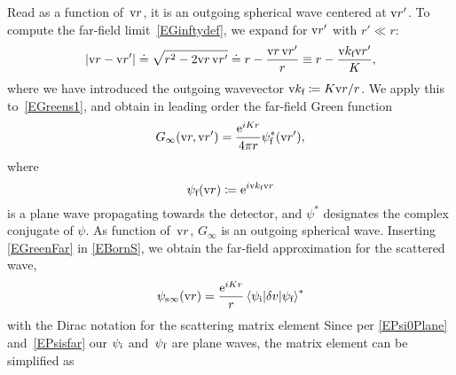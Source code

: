 Read as a function of~$\r$, it is an outgoing spherical wave centered at $\r'$.
To compute the far-field limit~\cref{EGinftydef},
we expand for $\r'$ with $r'\ll r$:
\begin{equation}
  \left|\r-\r'\right|
  \doteq \sqrt{r^2-2\r\,\r'}
  \doteq r - \frac{\r\,\r'}{r}
  \equiv r - \frac{\k_\sf \r'}{K},
\end{equation}
%
where we have introduced the outgoing wavevector
$  \k_\sf\coloneqq K \r / r$.
We apply this to~\cref{EGreens1},
%
and obtain in leading order the far-field Green function
\begin{equation}\label{EGreenFar}
  G_\infty(\r,\r')
  = \frac{\e^{iKr}}{4\pi r}\psi^*_\sf(\r'),
\end{equation}
%
where
\begin{equation}\label{EPsisfar}
  \psi_\sf(\r) \coloneqq  \e^{i\k_\sf \r}
\end{equation}
%
is a plane wave propagating towards the detector,
and $\psi^*$ designates the complex conjugate of $\psi$.
As function of~$\r$, $G_\infty$ is an outgoing spherical wave.
Inserting \cref{EGreenFar} in \cref{EBornS},
we obtain the far-field approximation for the scattered wave,
%
\begin{equation}\label{EsandwichC}
  \psi_{\text{s}\infty}(\r)
  = \frac{\e^{iKr}}{r}
    \bra \psi_\si|\delta v|\psi_\sf\ket^*
\end{equation}
%
with the Dirac notation for the scattering matrix element
%
%
%
Since per \cref{EPsi0Plane} and~\cref{EPsisfar} our $\psi_\si$ and~$\psi_\sf$ are plane waves,
the matrix element can be simplified as
